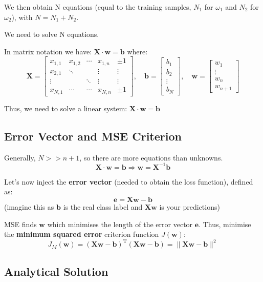 \documentclass[11pt,a4paper]{article}
\theoremstyle{definition}
\theoremstyle{plain}
\theoremstyle{remark}
\begin{document}
We then obtain N equations (equal to the training samples, $N_1$ for $\omega_1$ and $N_2$ for $\omega_2$), with $N = N_1 + N_2$.

We need to solve N equations.

In matrix notation we have: $\mathbf{X} \cdot \mathbf{w} = \mathbf{b}$ where:
\[
\mathbf{X} = \begin{bmatrix}
x_{1,1} & x_{1,2} & \cdots & x_{1,n} & \pm 1 \\
x_{2,1} & \ddots & & \vdots & \vdots \\
\vdots & & \ddots & \vdots & \vdots \\
x_{N,1} & \cdots & \cdots & x_{N,n} & \pm 1
\end{bmatrix}, \quad
\mathbf{b} = \begin{bmatrix}
b_1 \\ b_2 \\ \vdots \\ b_N
\end{bmatrix}, \quad
\mathbf{w} = \begin{bmatrix}
w_1 \\ \vdots \\ w_n \\ w_{n+1}
\end{bmatrix}
\]

Thus, we need to solve a linear system: $\mathbf{X} \cdot \mathbf{w} = \mathbf{b}$

\subsection{Error Vector and MSE Criterion}

Generally, $N >> n+1$, so there are more equations than unknowns.
\[
\mathbf{X} \cdot \mathbf{w} = \mathbf{b} \Rightarrow \mathbf{w} = \mathbf{X}^{-1} \mathbf{b}
\]

Let's now inject the \textbf{error vector} (needed to obtain the loss function), defined as:
\[
\mathbf{e} = \mathbf{X}\mathbf{w} - \mathbf{b}
\]
(imagine this as $\mathbf{b}$ is the real class label and $\mathbf{X}\mathbf{w}$ is your predictions)

MSE finds $\mathbf{w}$ which minimises the length of the error vector $\mathbf{e}$. Thus, minimise the \textbf{minimum squared error} criterion function $J(\mathbf{w})$:
\[
J_M(\mathbf{w}) = (\mathbf{X}\mathbf{w} - \mathbf{b})^{\mathrm{T}} (\mathbf{X}\mathbf{w} - \mathbf{b}) = \| \mathbf{X}\mathbf{w} - \mathbf{b} \|^2
\]

\subsection{Analytical Solution}
\end{document}
